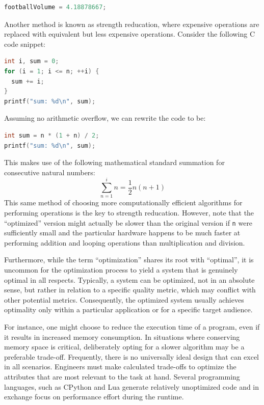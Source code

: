 {\begin{lstlisting}[language=C++]
footballVolume = 4.18878667;
\end{lstlisting}

Another method is known as strength reducation, where expensive operations are replaced with equivalent but less expensive operations. Consider the following C code snippet: 

\begin{lstlisting}[language=C]
int i, sum = 0;
for (i = 1; i <= n; ++i) {
  sum += i;
}
printf("sum: %d\n", sum);

\end{lstlisting}

Assuming no arithmetic overflow, we can rewrite the code to be:

\begin{lstlisting}[language=C]
int sum = n * (1 + n) / 2;
printf("sum: %d\n", sum);
\end{lstlisting}

This makes use of the following mathematical standard summation for consecutive natural numbers: 
\begin{equation}\sum_{n=1}^i n = \frac{1}{2}n(n+1)\end{equation}
This same method of choosing more computationally efficient algorithms for performing operations is the key to strength reducation. However, note that the ``optimized'' version might actually be slower than the original version if \verb+n+ were sufficiently small and the particular hardware happens to be much faster at performing addition and looping operations than multiplication and division.

Furthermore, while the term ``optimization'' shares its root with ``optimal'', it is uncommon for the optimization process to yield a system that is genuinely optimal in all respects. Typically, a system can be optimized, not in an absolute sense, but rather in relation to a specific quality metric, which may conflict with other potential metrics. Consequently, the optimized system usually achieves optimality only within a particular application or for a specific target audience.

For instance, one might choose to reduce the execution time of a program, even if it results in increased memory consumption. In situations where conserving memory space is critical, deliberately opting for a slower algorithm may be a preferable trade-off. Frequently, there is no universally ideal design that can excel in all scenarios. Engineers must make calculated trade-offs to optimize the attributes that are most relevant to the task at hand. Several programming languages, such as CPython and Lua generate relatively unoptimized code and in exchange focus on performance effort during the runtime. 

}

